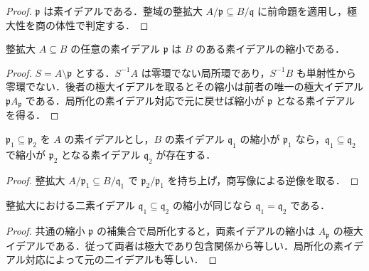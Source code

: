 \begin{proof}
$\mathfrak p$ は素イデアルである．整域の整拡大 $A/\mathfrak p\subseteq B/\mathfrak q$ に前命題を適用し，極大性を商の体性で判定する．
\end{proof}
\begin{prop}
整拡大 $A\subseteq B$ の任意の素イデアル $\mathfrak p$ は $B$ のある素イデアルの縮小である．
\end{prop}
\begin{proof}
$S=A\setminus\mathfrak p$ とする．$S^{-1}A$ は零環でない局所環であり，$S^{-1}B$ も単射性から零環でない．後者の極大イデアルを取るとその縮小は前者の唯一の極大イデアル $\mathfrak pA_{\mathfrak p}$ である．局所化の素イデアル対応で元に戻せば縮小が $\mathfrak p$ となる素イデアルを得る．
\end{proof}
\begin{prop}
$\mathfrak p_1\subseteq\mathfrak p_2$ を $A$ の素イデアルとし，$B$ の素イデアル $\mathfrak q_1$ の縮小が $\mathfrak p_1$ なら，$\mathfrak q_1\subseteq\mathfrak q_2$ で縮小が $\mathfrak p_2$ となる素イデアル $\mathfrak q_2$ が存在する．
\end{prop}
\begin{proof}
整拡大 $A/\mathfrak p_1\subseteq B/\mathfrak q_1$ で $\mathfrak p_2/\mathfrak p_1$ を持ち上げ，商写像による逆像を取る．
\end{proof}
\begin{prop}[素イデアルの非比較性]
整拡大における二素イデアル $\mathfrak q_1\subseteq\mathfrak q_2$ の縮小が同じなら $\mathfrak q_1=\mathfrak q_2$ である．
\end{prop}
\begin{proof}
共通の縮小 $\mathfrak p$ の補集合で局所化すると，両素イデアルの縮小は $A_{\mathfrak p}$ の極大イデアルである．従って両者は極大であり包含関係から等しい．局所化の素イデアル対応によって元の二イデアルも等しい．
\end{proof}
